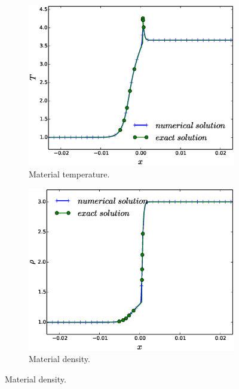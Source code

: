 \documentclass[times,doublespace]{fldauth}%
\begin{document}
\begin{figure}[h]
    \centering
    \begin{subfigure}{0.49\textwidth}
    \includegraphics[width=\linewidth]{figures/cst-xs/mach-3/mass-diff-mat-temp-nel-1000-plot.eps}
    \caption{Material temperature.}\label{fig:mach-3-cst-xs-temp}
    \end{subfigure}	
%
    \begin{subfigure}{0.49\textwidth}
    \includegraphics[width=\linewidth]{figures/cst-xs/mach-3/mass-diff-density-nel-1000-plot.eps}
    \caption{Material density.}\label{fig:mach-3-cst-xs-dens}
    \end{subfigure}

\end{figure}
\end{document}
